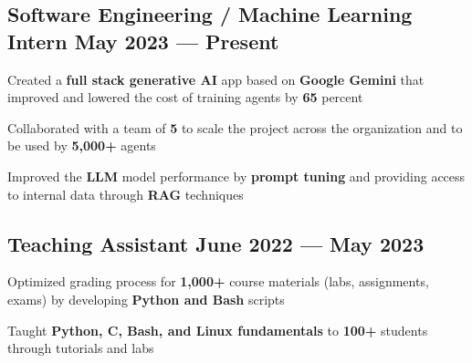
\subsection{{Software Engineering / Machine Learning Intern \hfill May 2023 --- Present}}
\begin{zitemize}
    \item Created a \textbf{full stack generative AI} app based on \textbf{Google Gemini} that improved and lowered the cost of training agents by \textbf{65} percent
    \item Collaborated with a team of \textbf{5} to scale the project across the organization and to be used by \textbf{5,000+} agents
    \item Improved the \textbf{LLM} model performance by \textbf{prompt tuning} and providing access to internal data through \textbf{RAG} techniques
\end{zitemize}


\vspace{0.3cm}\subsection{{Teaching Assistant \hfill June 2022 --- May 2023}}
\begin{zitemize}
    \item Optimized grading process for \textbf{1,000+} course materials (labs, assignments, exams) by developing \textbf{Python and Bash} scripts
    \item Taught \textbf{Python, C, Bash, and Linux fundamentals} to \textbf{100+} students through tutorials and labs
\end{zitemize}

